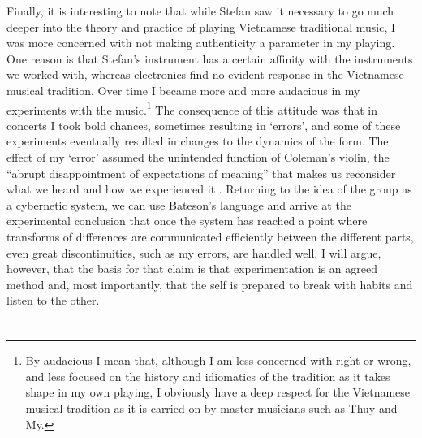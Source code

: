 \documentclass[a4paper]{article}
\begin{document}
Finally, it is interesting to note that while Stefan saw it necessary to go much deeper into the theory and practice of playing Vietnamese traditional music, I was more concerned with not making authenticity a parameter in my playing. One reason is that Stefan’s instrument has a certain affinity with the instruments we worked with, whereas electronics find no evident response in the Vietnamese musical tradition. Over time I became more and more audacious in my experiments with the music.\footnote{By audacious I mean that, although I am less concerned with right or wrong, and less focused on the history and idiomatics of the tradition as it takes shape in my own playing, I obviously have a deep respect for the Vietnamese musical tradition as it is carried on by master musicians such as Thuy and My.} 
The consequence of this attitude was that in concerts I took bold chances, sometimes resulting in `errors', and some of these experiments eventually resulted in changes to the dynamics of the form. The effect of my `error' assumed the unintended function of Coleman’s violin, the ``abrupt disappointment of expectations of meaning'' \autocite[144]{barthes68:death_of} that makes us reconsider what we heard and how we experienced it . Returning to the idea of the group as a cybernetic system, we can use Bateson’s language and arrive at the experimental conclusion that once the system has reached a point where transforms of differences are communicated efficiently between the different parts, even great discontinuities, such as my errors, are handled well. I will argue, however, that the basis for that claim is that experimentation is an agreed method and, most importantly, that the self is prepared to break with habits and listen to the other.


\section*{ }
\label{sec:discussion}
\end{document}

